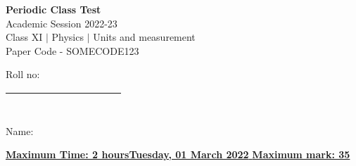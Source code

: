 \documentclass[10pt, a4paper]{exam}
\begin{document}
	\noindent 
    \begin{minipage}[l]{0.7\textwidth}
		\noindent \Huge \textbf{Periodic Class Test} \\
		\noindent \normalsize Academic Session 2022-23 \\
		\noindent Class XI $|$ Physics $|$ Units and measurement \\
		\noindent Paper Code - SOMECODE123 
	\end{minipage}
	\hfill\hfill
	\begin{minipage}[r]{0.3\textwidth}
			\normalsize	Roll no: \begin{tabular}{ |c|c|c|c|c|c|c|c| } 
 			\hline
 			$\;$ &$\;$ &$\;$ &$\;$ &$\;$ &$\;$ &$\;$ &$\;$ \\[5pt]
 			\hline
			\end{tabular} \vspace{0.05in}\\
			\normalsize	Name:\enspace\hrulefill
	\end{minipage}
	 
	
	\vspace{0.1in}
	\noindent \uline{\textbf{\normalsize Maximum Time: 2 hours}\hfill \normalsize 	\textbf{Tuesday, 01 March 2022} 	\hfill \normalsize \textbf{Maximum mark: 35}}
	
\end{document}

